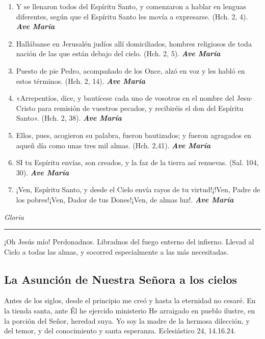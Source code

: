 \documentclass[a4paper,11pt, oneside]{report}
\begin{document}
{{\begin{enumerate}
        \item Y se llenaron todos del Espíritu Santo, y comenzaron a hablar en lenguas diferentes, según que el Espíritu Santo les movía
        a expresarse. (Hch. 2, 4). \textbf{\textit{Ave María}}

        \item Hallábanse en Jerusalén judíos allí domiciliados, hombres religiosos de toda nación de las que están debajo del cielo. (Hch. 2, 5). \textbf{\textit{Ave María}}

        \item Puesto de pie Pedro, acompañado de los Once, alzó en voz y les habló en estos términos. (Hch. 2, 14). \textbf{\textit{Ave María}}

        \item «Arrepentíos, dice, y bautícese cada uno de vosotros en el nombre del Jesu-Cristo para remisión de vuestros pecados, y recibiréis el don
        del Espíritu Santo». (Hch. 2, 38). \textbf{\textit{Ave María}}

        \item Ellos, pues, acogieron su palabra, fueron bautizados; y fueron agragados en aqueñ día como unas tres mil almas. (Hch. 2,41). \textbf{\textit{Ave María}}

        \item SI tu Espíritu envías, son creados, y la faz de la tierra así renuevas. (Sal. 104, 30). \textbf{\textit{Ave María}}

        \item ¡Ven, Espíritu Santo, y desde el Cielo envía rayos de tu virtud!¡!Ven, Padre de los pobres!¡Ven, Dador de tus Dones!¡Ven, de almas luz!. \textbf{\textit{Ave María}}
        
      \end{enumerate}      

      \indent\textit{Gloria} \par      

      \begin{center}\rule{1\linewidth}{\linethickness}\end{center}      

      \medskip
      \hypertarget{finalPentecostes}{¡Oh Jesús mío! Perdonadnos. Libradnos del fuego enterno del infierno. Llevad al Cielo a todas las almas, y socorred especialmente a las más 
      necesitadas.}
    }

  \subsection*{La Asunción de Nuestra Señora a los cielos}
    {
      Antes de los siglos, desde el principio me creó y hasta la eternidad no cesaré. En la tienda santa, ante Él he ejercido ministerio
      He arraigado en pueblo ilustre, en la porción del Señor, heredad suya. Yo soy la madre de la hermosa dilección, y del temor, y del
      conocimiento y santa esperanza. Eclesiástico 24, 14.16.24.

}}
\end{document}
